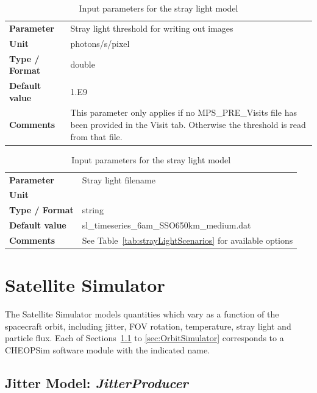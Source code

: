 \documentclass[11pt]{article}      %
\def\HCode#1{}
\def\htmlanchor#1{\HCode{<a id="#1"></a>}}
\begin{document}
\begin{table}[hbtp]
  \caption{Input parameters for the stray light model}

  \htmlanchor{strayLightThreshold}
  \begin{tabular}{| l | p{13cm} |}
    \hline 
    {\bf Parameter} & Stray light threshold for writing out images\\
    {\bf Unit} & photons/s/pixel\\
    {\bf Type / Format} & double\\
    {\bf Default value} & 1.E9\\
    {\bf Comments} & This parameter only applies if no MPS\_PRE\_Visits file has been provided in the Visit tab. Otherwise the threshold is read from that file.\\
    \hline
  \end{tabular}
  \bigskip

  \htmlanchor{strayLightFilename}
  \begin{tabular}{| l | p{13cm} |}
    \hline 
    {\bf Parameter} & Stray light filename\\
    {\bf Unit} & \\
    {\bf Type / Format} & string\\
    {\bf Default value} & sl\_timeseries\_6am\_SSO650km\_medium.dat\\
    {\bf Comments} & See Table~\ref{tab:strayLightScenarios} for available options\\
    \hline
  \end{tabular}
  \bigskip

  \label{tab:strayLight}
\end{table}

\clearpage
\section{Satellite Simulator}
\label{sec:Satellite}

The Satellite Simulator models quantities which vary as a function of the spacecraft orbit, including jitter, FOV rotation, temperature, stray light and particle flux. Each of Sections~\ref{sec:JitterProducer} to \ref{sec:OrbitSimulator} corresponds to a CHEOPSim software module with the indicated name.

\htmlanchor{JitterProducer}
\subsection{Jitter Model:  {\it JitterProducer}}
\label{sec:JitterProducer}
\end{document}
